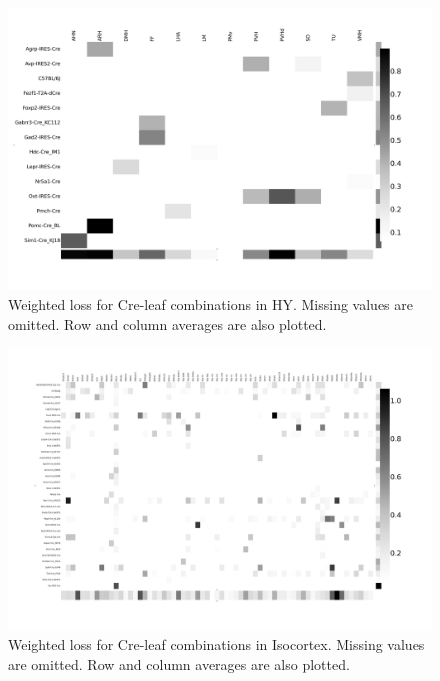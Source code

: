 \begin{figure}[H]
    \centering
    \includegraphics[width = 7in]{figs/lossdetails_1097.png} 
    \caption{Weighted loss for Cre-leaf combinations in HY. Missing values are omitted.   Row and column averages are also plotted.}
\end{figure}

\begin{figure}[H]
    \centering
    \includegraphics[width = 7in]{figs/lossdetails_315.png} 
    \caption{Weighted loss for Cre-leaf combinations in Isocortex. Missing values are omitted.  Row and column averages are also plotted.}
\end{figure}

